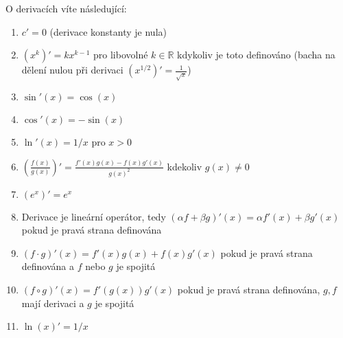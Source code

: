 \begin{theorem}
	O derivacích víte následující:
	\begin{enumerate}
		\item  $c' = 0$ (derivace konstanty je nula) \label{poucka:derivace_konstanty}
		\item  $(x^k)' = k x^{k-1}$ pro libovolné $k \in \mathbb{R}$ kdykoliv je toto definováno (bacha na dělení nulou při derivaci $(x^{1/2})' = \frac{1}{\sqrt{x}}$) \label{poucka:derivace_monomu}
		\item  $\sin'(x) = \cos(x)$ \label{poucka:derivace_sin}
		\item  $\cos'(x) = -\sin(x)$ \label{poucka:derivace_cos}
		\item  $\ln'(x) = 1/x$ pro $x>0$ \label{poucka:derivace_ln}
		\item  $\left( \frac{f(x)}{g(x)} \right)' = \frac{f'(x)g(x) - f(x)g'(x)}{g(x)^2}$ kdekoliv $g(x) \neq 0$
		\item  $(e^x)' = e^x$ \label{poucka:derivace_exponencialy}
		\item  Derivace je lineární operátor, tedy $(\alpha f + \beta g)'(x) = \alpha f'(x) + \beta g'(x)$ pokud je pravá strana definována \label{poucka:derivace_je_linearni_operator}
		\item  $(f\cdot g)'(x) = f'(x) g(x) + f(x) g'(x)$ pokud je pravá strana definována a $f$ nebo $g$ je spojitá \label{poucka:derivace_soucinu}
		\item  $(f\circ g)'(x) = f'(g(x)) g'(x)$ pokud je pravá strana definována, $g, f$ mají derivaci a $g$ je spojitá \label{poucka:derivace_slozene_fce}
		\item  $\ln(x)' = 1/x$
	\end{enumerate}
	\label{thm:poucky_o_derivacich}
\end{theorem}

